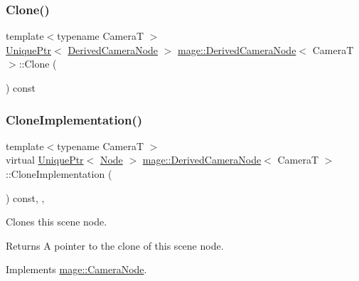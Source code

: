 \subsubsection{\texorpdfstring{Clone()}{Clone()}}
{\footnotesize\ttfamily template$<$typename CameraT $>$ \\
\hyperlink{namespacemage_a8c307fbcc33bce9b7f2aa4c26c3b95cf}{Unique\+Ptr}$<$ \hyperlink{classmage_1_1_derived_camera_node}{Derived\+Camera\+Node} $>$ \hyperlink{classmage_1_1_derived_camera_node}{mage\+::\+Derived\+Camera\+Node}$<$ CameraT $>$\+::Clone (\begin{DoxyParamCaption}{ }\end{DoxyParamCaption}) const}

\hypertarget{classmage_1_1_derived_camera_node_aa965751029ebd6b41d3805b499a8304e}{}\label{classmage_1_1_derived_camera_node_aa965751029ebd6b41d3805b499a8304e} 
\subsubsection{\texorpdfstring{Clone\+Implementation()}{CloneImplementation()}}
{\footnotesize\ttfamily template$<$typename CameraT $>$ \\
virtual \hyperlink{namespacemage_a8c307fbcc33bce9b7f2aa4c26c3b95cf}{Unique\+Ptr}$<$ \hyperlink{classmage_1_1_node}{Node} $>$ \hyperlink{classmage_1_1_derived_camera_node}{mage\+::\+Derived\+Camera\+Node}$<$ CameraT $>$\+::Clone\+Implementation (\begin{DoxyParamCaption}{ }\end{DoxyParamCaption}) const\hspace{0.3cm}{\ttfamily [override]}, {\ttfamily [private]}, {\ttfamily [virtual]}}

Clones this scene node.

\begin{DoxyReturn}{Returns}
A pointer to the clone of this scene node. 
\end{DoxyReturn}


Implements \hyperlink{classmage_1_1_camera_node_a002d3a2b41cda270a26ca5d8f3a17f55}{mage\+::\+Camera\+Node}.

\hypertarget{classmage_1_1_derived_camera_node_a423d9e416aec8ade92d0d2211d40de39}{}\label{classmage_1_1_derived_camera_node_a423d9e416aec8ade92d0d2211d40de39} 
